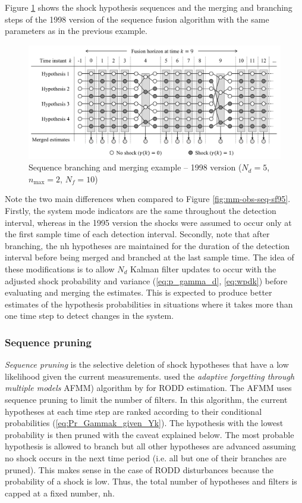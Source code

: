 Figure \ref{fig:mm-obs-seq-sf98} shows the shock hypothesis sequences and the merging and branching steps of the 1998 version of the sequence fusion algorithm with the same parameters as in the previous example.
\begin{figure}[htp]
	\centering
	\includegraphics[width=15cm]{images/mm_obs_seq_sf98.pdf}
	\caption{Sequence branching and merging example – 1998 version ($N_d=5$, $n_\text{max}=2$, $N_f=10$)}
	\label{fig:mm-obs-seq-sf98}
\end{figure}
Note the two main differences when compared to Figure \ref{fig:mm-obs-seq-sf95}. Firstly, the system mode indicators are the same throughout the detection interval, whereas in the 1995 version the shocks were assumed to occur only at the first sample time of each detection interval. Secondly, note that after branching, the \gls{nh} hypotheses are maintained for the duration of the detection interval before being merged and branched at the last sample time. The idea of these modifications is to allow $N_d$ Kalman filter updates to occur with the adjusted shock probability and variance (\ref{eq:p_gamma_d}, \ref{eq:wpdk}) before evaluating and merging the estimates. This is expected to produce better estimates of the hypothesis probabilities in situations where it takes more than one time step to detect changes in the system.

\subsubsection{Sequence pruning} \label{subsec-pruning}

\textit{Sequence pruning} is the selective deletion of shock hypotheses that have a low likelihood given the current measurements. \cite{eriksson_classification_1996} used the \textit{adaptive forgetting through multiple models} \gls{AFMM}) algorithm by \cite{andersson_adaptive_1985} for \gls{RODD} estimation. The \gls{AFMM} uses sequence pruning to limit the number of filters. In this algorithm, the current hypotheses at each time step are ranked according to their conditional probabilities (\ref{eq:Pr_Gammak_given_Yk}). The hypothesis with the lowest probability is then pruned with the caveat explained below. The most probable hypothesis is allowed to branch but all other hypotheses are advanced assuming no shock occurs in the next time period (i.e. all but one of their branches are pruned). This makes sense in the case of \gls{RODD} disturbances because the probability of a shock is low. Thus, the total number of hypotheses and filters is capped at a fixed number, \gls{nh}.

